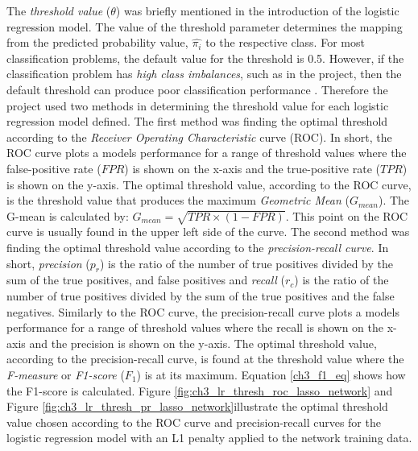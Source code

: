 The \textit{threshold value} ($\theta$) was briefly mentioned in the introduction of the logistic regression model. The value of the threshold parameter determines the mapping from the predicted probability value, $\hat{\pi_i}$ to the respective class. For most classification problems, the default value for the threshold is 0.5. However, if the classification problem has \textit{high class imbalances}, such as in the project, then the default threshold can produce poor classification performance \citep*{jason2016brownlee}. Therefore the project used two methods in determining the threshold value for each logistic regression model defined. The first method was finding the optimal threshold according to the \textit{Receiver Operating Characteristic} curve (ROC). In short, the ROC curve plots a models performance for a range of threshold values where the false-positive rate ($FPR$) is shown on the x-axis and the true-positive rate ($TPR$) is shown on the y-axis. The optimal threshold value, according to the ROC curve, is the threshold value that produces the maximum \textit{Geometric Mean} ($G_{mean}$). The G-mean is calculated by: $G_{mean} = \sqrt{TPR\times(1-FPR)}$. This point on the ROC curve is usually found in the upper left side of the curve. The second method was finding the optimal threshold value according to the \textit{precision-recall curve}. In short, \textit{precision} ($p_r$) is the ratio of the number of true positives divided by the sum of the true positives, and false positives and \textit{recall} ($r_c$) is the ratio of the number of true positives divided by the sum of the true positives and the false negatives. Similarly to the ROC curve, the precision-recall curve plots a models performance for a range of threshold values where the recall is shown on the x-axis and the precision is shown on the y-axis. The optimal threshold value, according to the precision-recall curve, is found at the threshold value where the \textit{F-measure} or \textit{F1-score} ($F_1$) is at its maximum. Equation \ref{ch3_f1_eq} shows how the F1-score is calculated. Figure \ref{fig:ch3_lr_thresh_roc_lasso_network} and Figure \ref{fig:ch3_lr_thresh_pr_lasso_network}illustrate the optimal threshold value chosen according to the ROC curve and precision-recall curves for the logistic regression model with an L1 penalty applied to the network training data.  


